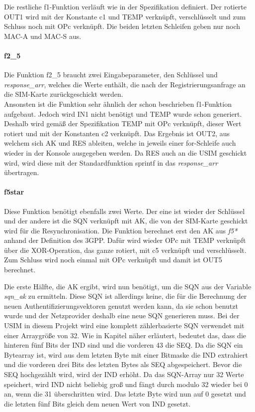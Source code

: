 		Die restliche f1-Funktion verläuft wie in der Spezifikation definiert. Der rotierte OUT1 wird mit der
		Konstante c1 und TEMP verknüpft, verschlüsselt und zum Schluss noch mit OPc verknüpft. Die beiden letzten
		Schleifen geben nur noch MAC-A und MAC-S aus.		
		
		\paragraph{f2\_5}
		Die Funktion f2\_5 braucht zwei Eingabeparameter, den Schlüssel und \emph{response\_arr}, welches
		die Werte enthält, die nach der Registrierungsanfrage an die SIM-Karte zurückgeschickt werden. \\
		Ansonsten ist die Funktion sehr ähnlich der schon beschrieben f1-Funktion aufgebaut. Jedoch wird IN1
		nicht benötigt und TEMP wurde schon generiert.
		Deshalb wird gemäß der Spezifikation TEMP mit OPc verknüpft, dieser Wert rotiert und mit
		der Konstanten c2 verknüpft. Das Ergebnis ist OUT2, aus welchem sich AK und RES ableiten, welche in jeweils
		einer for-Schleife auch wieder in der Konsole ausgegeben werden. Da RES auch an die USIM geschickt wird,
		wird diese mit der Standardfunktion sprintf in das \emph{response\_arr} übertragen.
		
        \clearpage
		\paragraph{f5star}
		Diese Funktion benötigt ebenfalls zwei Werte. Der eine ist wieder der Schlüssel und der andere ist die SQN
		verknüpft mit AK, die von der SIM-Karte geschickt wird für die Resynchronisation. Die Funktion berechnet erst
		den AK aus \emph{f5*} anhand der Definition des 3GPP. Dafür wird wieder OPc mit TEMP verknüpft über die
		XOR-Operation, das ganze rotiert, mit c5 verknüpft und verschlüsselt. Zum Schluss wird noch einmal mit
		OPc verknüpft und damit ist OUT5 berechnet.
		
		Die erste Hälfte, die AK ergibt, wird nun benötigt, um die SQN aus der Variable \emph{sqn\_ak} zu ermitteln.
		Diese SQN ist allerdings keine, die für die Berechnung der neuen Authentifizierungsvektoren genutzt werden
		kann, da sie schon benutzt wurde und der Netzprovider deshalb eine neue SQN generieren muss. Bei der USIM
		in diesem Projekt wird eine komplett zählerbasierte SQN verwendet mit einer Arraygröße von 32.
		Wie in Kapitel  näher erläutert, bedeutet das, dass die hinteren fünf Bits der
		IND sind und die vorderen 43 die SEQ. Da die SQN ein Bytearray ist, wird aus dem letzten Byte mit einer
		Bitmaske die IND extrahiert und die vorderen drei Bits des letzten Bytes als SEQ abgespeichert. Bevor
		die SEQ hochgezählt wird, wird der IND erhöht. Da das SQN-Array nur 32 Werte speichert, wird IND nicht
		beliebig groß und fängt durch modulo 32 wieder bei 0 an, wenn die 31 überschritten wird. Das letzte Byte
		wird nun auf 0 gesetzt und die letzten fünf Bits gleich dem neuen Wert von IND gesetzt.

